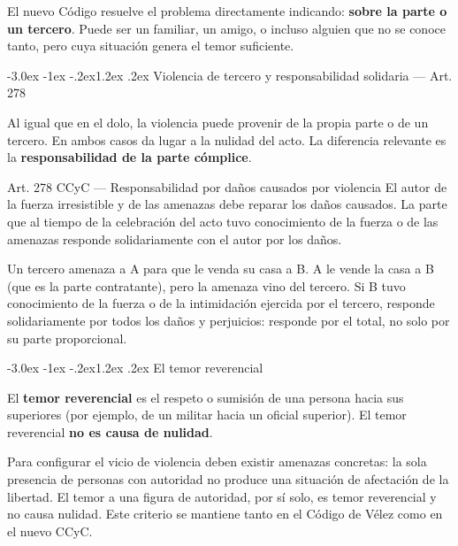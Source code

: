 \documentclass[12pt,oneside]{book}
\makeatletter
\renewcommand\section{\@startsection{section}{1}{\z@}%
  {-3.0ex \@plus -1ex \@minus -.2ex}{1.2ex \@plus .2ex}%
  {\normalfont\large\bfseries\color{acento}}}
\makeatother
\begin{document}
El nuevo Código resuelve el problema directamente indicando: \textbf{sobre la parte o un tercero}. Puede ser un familiar, un amigo, o incluso alguien que no se conoce tanto, pero cuya situación genera el temor suficiente.

\section{Violencia de tercero y responsabilidad solidaria --- Art. 278}

Al igual que en el dolo, la violencia puede provenir de la propia parte o de un tercero. En ambos casos da lugar a la nulidad del acto. La diferencia relevante es la \textbf{responsabilidad de la parte cómplice}.

\begin{articulo}{Art. 278 CCyC --- Responsabilidad por daños causados por violencia}
El autor de la fuerza irresistible y de las amenazas debe reparar los daños causados. La parte que al tiempo de la celebración del acto tuvo conocimiento de la fuerza o de las amenazas responde solidariamente con el autor por los daños.
\end{articulo}

\begin{ejemplo}
Un tercero amenaza a A para que le venda su casa a B. A le vende la casa a B (que es la parte contratante), pero la amenaza vino del tercero. Si B tuvo conocimiento de la fuerza o de la intimidación ejercida por el tercero, responde solidariamente por todos los daños y perjuicios: responde por el total, no solo por su parte proporcional.
\end{ejemplo}

\section{El temor reverencial}

El \textbf{temor reverencial} es el respeto o sumisión de una persona hacia sus superiores (por ejemplo, de un militar hacia un oficial superior). El temor reverencial \textbf{no es causa de nulidad}.

Para configurar el vicio de violencia deben existir amenazas concretas: la sola presencia de personas con autoridad no produce una situación de afectación de la libertad. El temor a una figura de autoridad, por sí solo, es temor reverencial y no causa nulidad. Este criterio se mantiene tanto en el Código de Vélez como en el nuevo CCyC.
\end{document}
